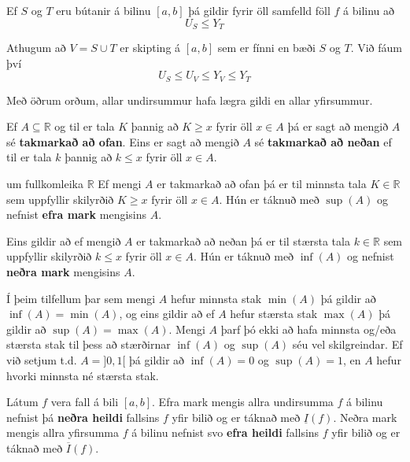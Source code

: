 \begin{regla}{}
Ef $S$ og $T$ eru bútanir á bilinu $[a,b]$ þá gildir fyrir öll samfelld föll $f$ á bilinu að
$$
U_{S} \leq Y_{T}
$$
\end{regla}

\begin{sonnun}
Athugum að $V = S \cup T$ er skipting á $[a,b]$ sem er fínni en bæði $S$ og $T$. Við fáum því 
$$
U_{S} \leq U_{V} \leq Y_{V} \leq Y_{T}
$$
\end{sonnun}

\begin{ath}
Með öðrum orðum, allar undirsummur hafa lægra gildi en allar yfirsummur.
\end{ath}

\begin{skilgr}{}
Ef $A \subseteq \mathbb{R}$ og til er tala $K$ þannig að $K \geq x$ fyrir öll $x \in A$ þá er sagt að mengið $A$ sé \textbf{takmarkað að ofan}. Eins er sagt að mengið $A$ sé \textbf{takmarkað að neðan} ef til er tala $k$ þannig að $k \leq x$ fyrir öll $x \in A$.
\end{skilgr}

\begin{frumsenda}{um fullkomleika $\mathbb{R}$}
Ef mengi $A$ er takmarkað að ofan þá er til minnsta tala $K \in \mathbb{R}$ sem uppfyllir skilyrðið $K \geq x$ fyrir öll $x \in A$. Hún er táknuð með $\sup(A)$ og nefnist \textbf{efra mark} mengisins $A$.

\vspace{2mm}

Eins gildir að ef mengið $A$ er takmarkað að neðan þá er til stærsta tala $k \in \mathbb{R}$ sem uppfyllir skilyrðið $k \leq x$ fyrir öll $x \in A$. Hún er táknuð með $\inf(A)$ og nefnist \textbf{neðra mark} mengisins $A$.

\end{frumsenda}

\begin{ath}
Í þeim tilfellum þar sem mengi $A$ hefur minnsta stak $\min(A)$ þá gildir að $\inf(A) = \min(A)$, og eins gildir að ef $A$ hefur stærsta stak $\max(A)$ þá gildir að $\sup(A) = \max(A)$. Mengi $A$ þarf þó ekki að hafa minnsta og/eða stærsta stak til þess að stærðirnar $\inf(A)$ og $\sup(A)$ séu vel skilgreindar. Ef við setjum t.d. $A = ]0,1[$ þá gildir að $\inf(A) = 0$ og $\sup(A) = 1$, en $A$ hefur hvorki minnsta né stærsta stak.
\end{ath}

\begin{skilgr}{}
Látum $f$ vera fall á bili $[a,b]$. Efra mark mengis allra undirsumma $f$ á bilinu nefnist þá \textbf{neðra heildi} fallsins $f$ yfir bilið og er táknað með $\underline{I}(f)$. Neðra mark mengis allra yfirsumma $f$ á bilinu nefnist svo \textbf{efra heildi} fallsins $f$ yfir bilið og er táknað með $\overline{I}(f)$.
\end{skilgr}

